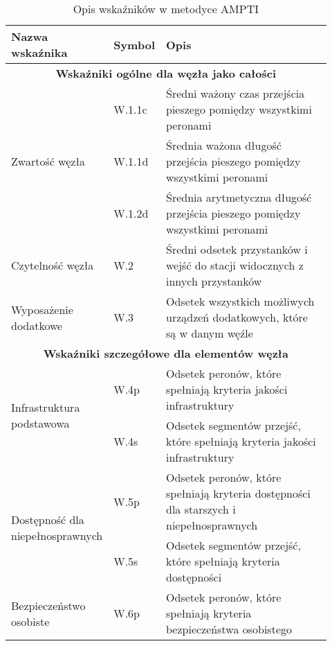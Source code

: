 \documentclass[twoside,12pt]{article}
\begin{document}
	\def\malaczcionka#1{\footnotesize{#1}}
\begin{table}[H]
  \centering
  \caption{Opis wskaźników w metodyce AMPTI}
			\begin{tabular}{p{0.2\linewidth}p{0.1\linewidth}p{0.625\linewidth}}
			\toprule
			\textbf{Nazwa wskaźnika} & \textbf{Symbol} & \textbf{Opis} \bigstrut[b]\\
			\midrule
			\multicolumn{3}{c}{\textbf{Wskaźniki ogólne dla węzła jako całości}}  \bigstrut\\
			\midrule
			\multirow{3}{\linewidth}{Zwartość węzła} & W.1.1c     & \malaczcionka{Średni ważony czas przejścia pieszego pomiędzy wszystkimi peronami} \bigstrut[t]\\
			           & W.1.1d     & \malaczcionka{Średnia ważona długość przejścia pieszego pomiędzy wszystkimi peronami} \\
			           & W.1.2d     & \malaczcionka{Średnia arytmetyczna długość przejścia pieszego pomiędzy wszystkimi peronami} \bigstrut[b]\\
			\midrule
			Czytelność węzła & W.2        & \malaczcionka{Średni odsetek przystanków i wejść do stacji widocznych z innych przystanków} \bigstrut\\
			\midrule
			Wyposażenie dodatkowe & W.3        & \malaczcionka{Odsetek wszystkich możliwych urządzeń dodatkowych, które są w danym węźle} \bigstrut\\
			\midrule
			\multicolumn{3}{c}{\textbf{Wskaźniki szczegółowe dla elementów węzła}} \bigstrut\\
			\midrule
			\multirow{2}{\linewidth}{Infrastruktura podstawowa} & W.4p       & \malaczcionka{Odsetek peronów, które spełniają kryteria jakości infrastruktury} \bigstrut[t]\\
			           & W.4s       & \malaczcionka{Odsetek segmentów przejść, które spełniają kryteria jakości infrastruktury} \bigstrut[b]\\
			\midrule
			\multirow{2}{\linewidth}{Dostępność dla niepełnosprawnych} & W.5p       & \malaczcionka{Odsetek peronów, które spełniają kryteria dostępności dla starszych i niepełnosprawnych} \bigstrut[t]\\
			           & W.5s       & \malaczcionka{Odsetek segmentów przejść, które spełniają kryteria dostępności} \bigstrut[b]\\
			\midrule
			\multirow{2}{\linewidth}{Bezpieczeństwo osobiste} & W.6p       & \malaczcionka{Odsetek peronów, które spełniają kryteria bezpieczeństwa osobistego} \bigstrut[t]\\

\end{tabular}
\end{table}
\end{document}
